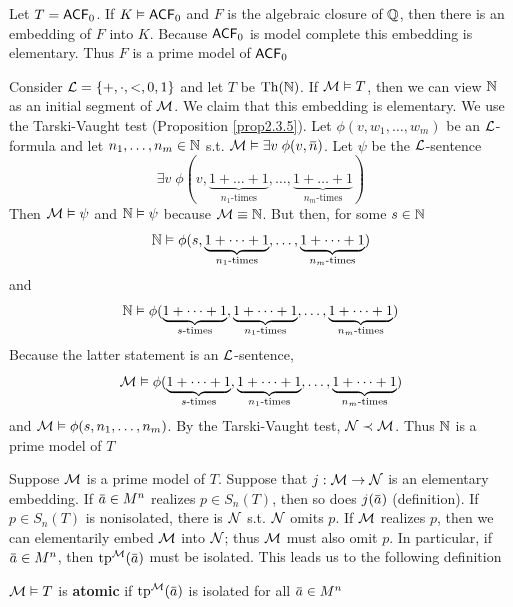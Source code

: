 \documentclass[11pt]{article}
\begin{document}
Let \(T=\textsf{ACF}_0\). If \(K\vDash\textsf{ACF}_0\) and \(F\) is the algebraic closure of \(\mathbb{Q}\), then there is an
embedding of \(F\) into \(K\). Because \(\textsf{ACF}_0\) is model complete this embedding is
elementary. Thus \(F\) is a prime model of \(\textsf{ACF}_0\)

Consider \(\mathcal{L}=\{+,\cdot,<,0,1\}\) and let \(T\) be \(\operatorname{Th}(\mathbb{N})\). If \(\mathcal{M}\vDash T\), then we can view \(\mathbb{N}\) as
an initial segment of \(\mathcal{M}\). We claim that this embedding is elementary. We use the
Tarski-Vaught test (Proposition \ref{prop2.3.5}). Let \(\phi(v,w_1,\dots,w_m)\) be an \(\mathcal{L}\)-formula and
let \(n_1,\dots,n_m\in\mathbb{N}\) s.t. \(\calm\vDash\exists v\;\phi(v,\barn)\). Let \(\psi\) be the \(\mathcal{L}\)-sentence
\begin{equation*}
\exists v\;\phi(v,\underbrace{1+\dots+1}_{n_1\text{-times}},\dots,\underbrace{1+\dots+1}_{n_m\text{-times}})
\end{equation*}
Then \(\mathcal{M}\vDash\psi\) and \(\mathbb{N}\vDash\psi\) because \(\mathcal{M}\equiv\mathbb{N}\). But then, for some \(s\in\mathbb{N}\)
\begin{equation*}
    \mathbb{N}\vDash\phi(s,\underbrace{1+\dots+1}_{n_1\text{-times}},\dots,\underbrace{1+\dots+1}_{n_m\text{-times}})
    \end{equation*}
and
\begin{equation*}
    \mathbb{N}\vDash\phi(\underbrace{1+\dots+1}_{s\text{-times}},\underbrace{1+\dots+1}_{n_1\text{-times}},\dots,\underbrace{1+\dots+1}_{n_m\text{-times}})
    \end{equation*}
Because the latter statement is an \(\mathcal{L}\)-sentence,
\begin{equation*}
    \mathcal{M}\vDash\phi(\underbrace{1+\dots+1}_{s\text{-times}},\underbrace{1+\dots+1}_{n_1\text{-times}},\dots,\underbrace{1+\dots+1}_{n_m\text{-times}})
    \end{equation*}
and \(\mathcal{M}\vDash\phi(s,n_1,\dots,n_m)\). By the Tarski-Vaught test, \(\mathcal{N}\prec\mathcal{M}\). Thus \(\mathbb{N}\) is a prime model
of \(T\)

Suppose \(\mathcal{M}\) is a prime model of \(T\). Suppose that \(j:\mathcal{M}\to\mathcal{N}\) is an elementary embedding.
If \(\bara\in M^n\) realizes \(p\in S_n(T)\), then so does \(j(\bara)\) (definition).
If \(p\in S_n(T)\) is nonisolated, there is \(\mathcal{N}\) s.t. \(\mathcal{N}\) omits \(p\). If \(\mathcal{M}\) realizes \(p\),
then we can elementarily embed \(\mathcal{M}\) into \(\mathcal{N}\); thus \(\mathcal{M}\) must also omit \(p\). In particular,
if \(\bara\in M^n\), then \(\tp^{\calm}(\bara)\) must be isolated. This leads us to the following
definition

\begin{definition}[]
\(\mathcal{M}\vDash T\) is \textbf{atomic} if \(\tp^{\calm}(\bara)\) is isolated for all \(\bara\in M^n\)
\end{definition}
\end{document}

